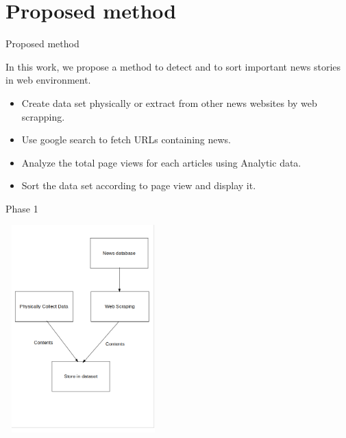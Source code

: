 \section{Proposed method}

\begin{frame}{Proposed method}
        \begin{center}\fontsize{15}{1}\selectfont
            {\color{red}In this work, we propose a method to detect and to sort important news stories in web environment.}
        \end{center}
	    \begin{itemize}
	        \item  \Large{Create data set physically or extract from other news websites by web scrapping.}
	   \end{itemize}
	   \begin{itemize}
	        \item \Large {Use google search to fetch URLs containing news. }
	   \end{itemize}
	   \begin{itemize}
	        \item \Large {Analyze the total page views for each articles using Analytic data.}
	   \end{itemize}
	   \begin{itemize}
	         \item \Large {Sort the data set according to page view and display it. }
	   \end{itemize}
\end{frame}
\begin{frame}{Phase 1}
	\begin{center}
	\includegraphics[width=6cm, height=8cm]{proposedmethod/Phase1.png}
	\end{center}
\end{frame}
